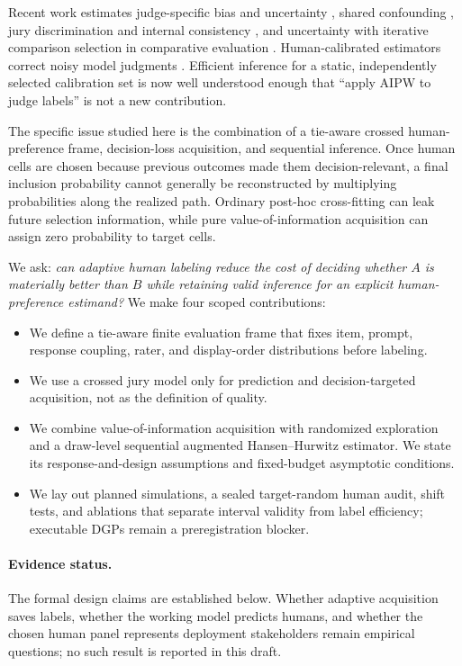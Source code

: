 \documentclass{article}
\begin{document}
Recent work estimates judge-specific bias and uncertainty
\cite{dubois2026biases}, shared confounding \cite{zhao2026care}, jury
discrimination and internal consistency \cite{qian2026jury}, and uncertainty
with iterative comparison selection in comparative evaluation
\cite{fathullah2025uncertainty}. Human-calibrated estimators correct noisy
model judgments \cite{lee2026report,chen2026efficient}. Efficient inference for
a static, independently selected calibration set is now well understood enough
that ``apply AIPW to judge labels'' is not a new contribution.

The specific issue studied here is the combination of a tie-aware crossed
human-preference frame, decision-loss acquisition, and sequential inference.
Once human cells are chosen because previous outcomes made them
decision-relevant, a final inclusion probability cannot generally be
reconstructed by multiplying probabilities along the realized path. Ordinary
post-hoc cross-fitting can leak future selection information, while pure
value-of-information acquisition can assign zero probability to target cells.

We ask: \emph{can adaptive human labeling reduce the cost of deciding whether
$A$ is materially better than $B$ while retaining valid inference for an
explicit human-preference estimand?} We make four scoped contributions:
\begin{itemize}
  \item We define a tie-aware finite evaluation frame that fixes item, prompt,
  response coupling, rater, and display-order distributions before labeling.
  \item We use a crossed jury model only for prediction and decision-targeted
  acquisition, not as the definition of quality.
  \item We combine value-of-information acquisition with randomized exploration
  and a draw-level sequential augmented Hansen--Hurwitz estimator. We state
  its response-and-design assumptions and fixed-budget asymptotic conditions.
  \item We lay out planned simulations, a sealed target-random human audit,
    shift tests, and ablations that separate interval validity from label
    efficiency; executable DGPs remain a preregistration blocker.
\end{itemize}

\paragraph{Evidence status.}
The formal design claims are established below. Whether adaptive acquisition
saves labels, whether the working model predicts humans, and whether the chosen
human panel represents deployment stakeholders remain empirical questions; no
such result is reported in this draft.
\end{document}
